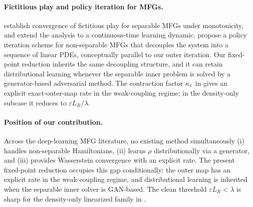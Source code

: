 \paragraph{Fictitious play and policy iteration for MFGs.}
\citet{cardaliaguet2017learning} establish convergence of fictitious play
for separable MFGs under monotonicity, and \citet{perrin2020fictitious}
extend the analysis to a continuous-time learning dynamic.
\citet{lavigne2023policy} propose a policy iteration scheme for
non-separable MFGs that decouples the system into a sequence of linear
PDEs, conceptually parallel to our outer iteration.
Our fixed-point reduction inherits the same decoupling structure, and it can
retain distributional learning whenever the separable inner problem is solved
by a generator-based adversarial method.  The contraction factor \(\kappa_\varepsilon\) in
 gives an explicit exact-outer-map rate in the weak-coupling
regime; in the density-only subcase it reduces to
\(\varepsilon L_R/\lambda\).

\paragraph{Position of our contribution.}
Across the deep-learning MFG literature, no existing method
simultaneously (i) handles non-separable Hamiltonians,
(ii) learns $\rho$ distributionally via a generator,
and (iii) provides Wasserstein convergence with an explicit rate.
The present fixed-point reduction occupies this gap conditionally: the outer
map has an explicit rate in the weak-coupling regime, and distributional
learning is inherited when the separable inner solver is GAN-based.  The clean
threshold \(\varepsilon L_R<\lambda\) is sharp for the density-only linearized
family in .
